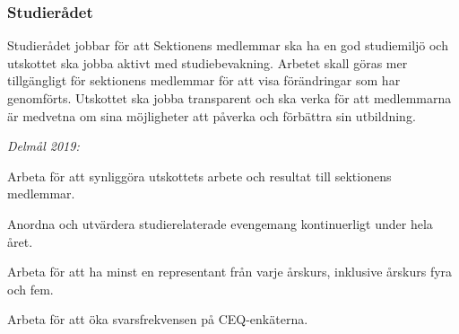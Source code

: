 \documentclass[../_main/handlingar.tex]{subfiles}
\begin{document}
\subsubsection*{Studierådet}
Studierådet jobbar för att Sektionens medlemmar ska ha en god studiemiljö och utskottet ska jobba aktivt med studiebevakning. Arbetet skall göras mer tillgängligt för sektionens medlemmar för att visa förändringar som har genomförts. Utskottet ska jobba transparent och ska verka för att medlemmarna är medvetna om sina möjligheter att påverka och förbättra sin utbildning. 

\emph{Delmål 2019:}
\begin{dashlist}
    \item Arbeta för att synliggöra utskottets arbete och resultat till sektionens medlemmar. 
    \item Anordna och utvärdera studierelaterade evengemang kontinuerligt under hela året.
    \item Arbeta för att ha minst en representant från varje årskurs, inklusive årskurs fyra och fem. 
    \item Arbeta för att öka svarsfrekvensen på CEQ-enkäterna.        
\end{dashlist}

\newpage
\end{document}
